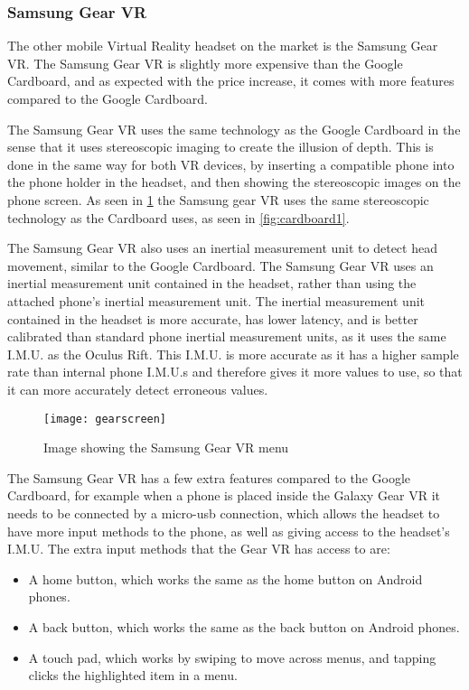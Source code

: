 \subsubsection{Samsung Gear VR}
The other mobile Virtual Reality headset on the market is the Samsung Gear VR. The Samsung Gear VR is slightly more expensive than the Google Cardboard, and as expected with the price increase, it comes with more features compared to the Google Cardboard.
\newline
\par
The Samsung Gear VR uses the same technology as the Google Cardboard in the sense that it uses stereoscopic imaging to create the illusion of depth. This is done in the same way for both VR devices, by inserting a compatible phone into the phone holder in the headset, and then showing the stereoscopic images on the phone screen. As seen in \ref{fig:gearscreen} the Samsung gear VR uses the same stereoscopic technology as the Cardboard uses, as seen in \ref{fig:cardboard1}.
\newline
\par
The Samsung Gear VR also uses an inertial measurement unit to detect head movement, similar to the Google Cardboard. The Samsung Gear VR uses an inertial measurement unit contained in the headset, rather than using the attached phone's inertial measurement unit. The inertial measurement unit contained in the headset is more accurate, has lower latency, and is better calibrated than standard phone inertial measurement units, as it uses the same I.M.U. as the Oculus Rift. This I.M.U. is more accurate as it has a higher sample rate than internal phone I.M.U.s and therefore gives it more values to use, so that it can more accurately detect erroneous values.

\begin{figure}[h]
	\texttt{[image: gearscreen]}
	\centering
	\caption{Image showing the Samsung Gear VR menu \cite{gearmenu}}
	\label{fig:gearscreen}
\end{figure}

The Samsung Gear VR has a few extra features compared to the Google Cardboard, for example when a phone is placed inside the Galaxy Gear VR it needs to be connected by a micro-usb connection, which allows the headset to have more input methods to the phone, as well as giving access to the headset's I.M.U. The extra input methods that the Gear VR has access to are:\\

\begin{itemize}
	\item A home button, which works the same as the home button on Android phones.
	\item A back button, which works the same as the back button on Android phones.
	\item A touch pad, which works by swiping to move across menus, and tapping clicks the highlighted item in a menu.
\end{itemize}

